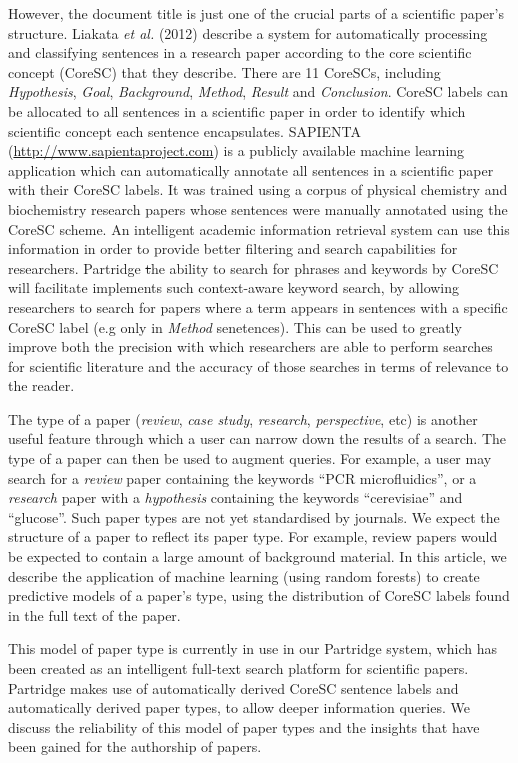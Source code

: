 \documentclass{svmult}
\begin{document}
However, the document title is just one of the crucial parts of a scientific
paper's structure.  Liakata \emph{et al.} (2012) describe a system for
automatically processing and classifying sentences in a research paper
according to the core scientific concept (CoreSC) that they
describe\cite{Liakata2012}.  There are 11 CoreSCs, including {\em Hypothesis},
{\em Goal}, {\it Background}, {\em Method}, {\em Result} and {\em Conclusion}.
CoreSC labels can be allocated to all sentences in a scientific paper in order
to identify which scientific concept each sentence encapsulates.  SAPIENTA
(\url{http://www.sapientaproject.com}) is a publicly available machine learning
application which can automatically annotate all sentences in a scientific
paper with their CoreSC labels. It was trained using a corpus of physical
chemistry and biochemistry research papers whose sentences were manually
annotated using the CoreSC\cite{LIAKATA10.644} scheme.  An intelligent academic
information retrieval system can use this information in order to provide
better filtering and search capabilities for researchers.  Partridge {\st the
ability to search for phrases and keywords by CoreSC will facilitate}
implements such context-aware keyword search, by allowing researchers to search
for papers where a term appears in sentences with a specific CoreSC label (e.g
only in {\em Method} senetences). This can be used to greatly improve both the
precision with which researchers are able to perform searches for scientific
literature and the accuracy of those searches in terms of relevance to the
reader.

The type of a paper ({\em review}, {\em case study}, {\em research}, {\em
perspective}, etc) is another useful feature through which a user can narrow
down the results of a search.  The type of a paper can then be used to augment
queries.  For example, a user may search for a {\em review} paper containing
the keywords ``PCR microfluidics'', or a {\em research} paper with a {\em
hypothesis} containing the keywords ``cerevisiae'' and ``glucose''.   Such
paper types are not yet standardised by journals.  We expect the structure of a
paper to reflect its paper type.  For example, review papers would be expected
to contain a large amount of background material.  In this article, we describe
the application of machine learning (using random forests) to create predictive
models of a paper's type, using the distribution of CoreSC labels found in the
full text of the paper. 

This model of paper type is currently in use in our Partridge system, which has
been created as an intelligent full-text search platform for scientific papers.
Partridge makes use of automatically derived CoreSC sentence labels and
automatically derived paper types, to allow deeper information queries.  We
discuss the reliability of this model of paper types and the insights that have
been gained for the authorship of papers.
\end{document}
